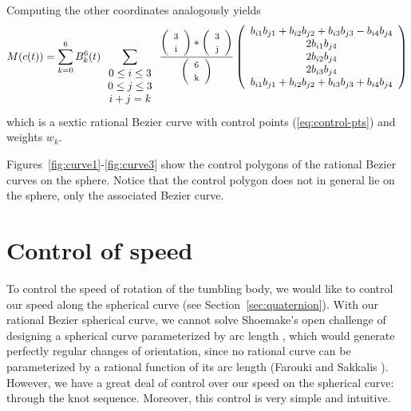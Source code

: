 Computing the other coordinates analogously yields
\[ M(c(t)) = \sum_{k=0}^6 B_k^6(t) 
	\sum_{\begin{array}{c} 0 \leq i \leq 3 \\ 
			     0 \leq j \leq 3 \\ 
			     i+j=k
			     \end{array}} 
        \frac{\left( \begin{array}{c} \mbox{\footnotesize{3}} \\ \mbox{\footnotesize{i}} \end{array} \right) * \left( \begin{array}{c} \mbox{\footnotesize{3}} \\ \mbox{\footnotesize{j}} \end{array} \right)}{\left( \begin{array}{c} \mbox{\footnotesize{6}} \\ \mbox{\footnotesize{k}} \end{array} \right)}
	\left( \begin{array}{c}
            b_{i1} b_{j1} + b_{i2} b_{j2} + b_{i3} b_{j3} - b_{i4} b_{j4} \\
            2b_{i1} b_{j4} \\
            2b_{i2} b_{j4} \\
            2b_{i3} b_{j4} \\
            b_{i1} b_{j1} + b_{i2} b_{j2} + b_{i3} b_{j3} + b_{i4} b_{j4}
	\end{array} \right) \]
%
which is a sextic rational Bezier curve with 
control points (\ref{eq:control-pts}) and weights $w_k$.
\QED

Figures~\ref{fig:curve1}-\ref{fig:curve3} show the control polygons of 
the rational Bezier curves on the sphere.  
Notice that the control polygon does not in general
lie on the sphere, only the associated Bezier curve.

\section{Control of speed}
\label{sec:speed}

To control the speed of rotation of the tumbling body,
we would like to control our speed along the spherical curve
(see Section~\ref{sec:quaternion}).
With our rational Bezier spherical curve, we cannot solve
Shoemake's open challenge of designing a spherical curve
parameterized by arc length \cite{shoemake85},
which would generate perfectly regular changes of orientation,
since no rational curve can be parameterized by a rational function
of its arc length (Farouki and Sakkalis \cite{farouki91}).
However, we have a great deal of control over our speed on the
spherical curve: through the knot sequence.
Moreover, this control is very simple and intuitive.

